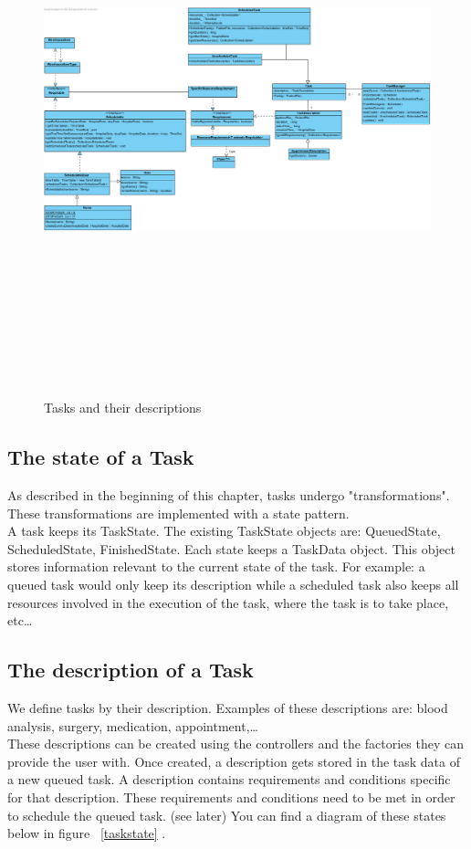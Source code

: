 \documentclass[12pt]{article}
\begin{document}
\begin{figure}[h!]
\includegraphics[width=220mm,height=160mm,angle=90]{Task-Description.png}
\caption{Tasks and their descriptions}
\label{taskuml}
\end{figure}

\subsection{The state of a Task}
As described in the beginning of this chapter, tasks undergo "transformations". These transformations are implemented with a state pattern.\\
A task keeps its TaskState. The existing TaskState objects are: QueuedState, ScheduledState, FinishedState. Each state keeps a TaskData object. This object stores information relevant to the current state of the task. For example: a queued task would only keep its description while a scheduled task also keeps all resources involved in the execution of the task, where the task is to take place, etc\dots
\subsection{The description of a Task}
We define tasks by their description. Examples of these descriptions are: blood analysis, surgery, medication, appointment,\dots \\
These descriptions can be created using the controllers and the factories they can provide the user with. Once created, a description gets stored in the task data of a new queued task. A description contains requirements and conditions  specific for that description. These requirements and conditions need to be met in order to schedule the queued task. (see later) You can find a diagram of these states below in figure ~\ref{taskstate} .
\end{document}
